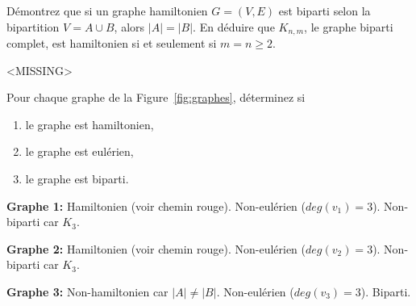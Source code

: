 \begin{exo}
D\'emontrez que si un graphe hamiltonien $G = (V,E)$ est biparti selon la bipartition $V = A \cup B$, alors $|A|= |B|$. En d\'eduire que $K_{n,m}$, le graphe biparti complet, est hamiltonien si et seulement si $m=n \geq 2$.

\end{exo}

<MISSING>


\begin{exo}
Pour chaque graphe de la Figure~\ref{fig:graphes}, d\'eterminez si 
\begin{enumerate}
\item le graphe est hamiltonien,
\item le graphe est eul\'erien,
\item le graphe est biparti.
\end{enumerate}
\end{exo}




\textbf{Graphe 1:} Hamiltonien (voir chemin rouge). Non-eulérien ($deg(v_1)=3$). Non-biparti car $K_3$.

\textbf{Graphe 2:} Hamiltonien (voir chemin rouge). Non-eulérien ($deg(v_2)=3$). Non-biparti car $K_3$.

\textbf{Graphe 3:} Non-hamiltonien car $|A| \neq |B|$. Non-eulérien ($deg(v_3)=3$). Biparti.




